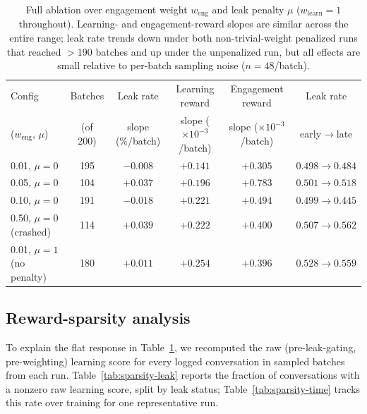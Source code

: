 \documentclass[11pt]{article}
\begin{document}
\begin{table}[h]
\centering
\small
\begin{tabular}{lccccc}
\toprule
Config & Batches & Leak rate & Learning reward & Engagement reward & Leak rate \\
($w_{\text{eng}}$, $\mu$) & (of 200) & slope (\%/batch) & slope ($\times 10^{-3}$/batch) & slope ($\times 10^{-3}$/batch) & early$\to$late \\
\midrule
0.01, $\mu{=}0$ & 195 & $-0.008$ & $+0.141$ & $+0.305$ & $0.498\to0.484$ \\
0.05, $\mu{=}0$ & 104 & $+0.037$ & $+0.196$ & $+0.783$ & $0.501\to0.518$ \\
0.10, $\mu{=}0$ & 191 & $-0.018$ & $+0.221$ & $+0.494$ & $0.499\to0.445$ \\
0.50, $\mu{=}0$ (crashed) & 114 & $+0.039$ & $+0.222$ & $+0.400$ & $0.507\to0.562$ \\
0.01, $\mu{=}1$ (no penalty) & 180 & $+0.011$ & $+0.254$ & $+0.396$ & $0.528\to0.559$ \\
\bottomrule
\end{tabular}
\caption{Full ablation over engagement weight $w_{\text{eng}}$ and leak
penalty $\mu$ ($w_{\text{learn}}=1$ throughout). Learning- and
engagement-reward slopes are similar across the entire range; leak rate
trends down under both non-trivial-weight penalized runs that reached
$>$190 batches and up under the unpenalized run, but all effects are small
relative to per-batch sampling noise ($n{=}48$/batch).}
\label{tab:grpo-ablation}
\end{table}

\subsection{Reward-sparsity analysis}
\label{app:grpo-sparsity}

To explain the flat response in Table~\ref{tab:grpo-ablation}, we recomputed
the raw (pre-leak-gating, pre-weighting) learning score for every logged
conversation in sampled batches from each run. Table~\ref{tab:sparsity-leak}
reports the fraction of conversations with a nonzero raw learning score,
split by leak status; Table~\ref{tab:sparsity-time} tracks this rate over
training for one representative run.
\end{document}
